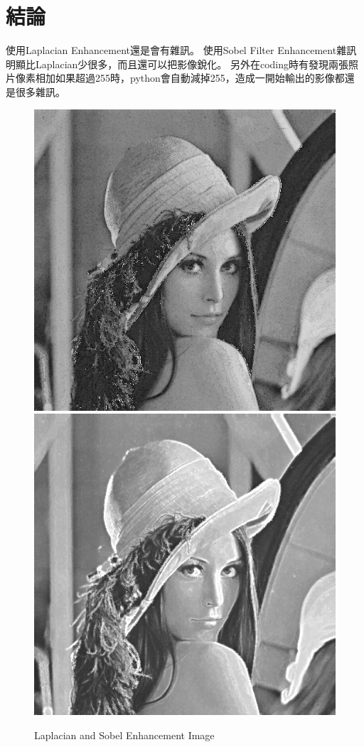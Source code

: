 \documentclass[12pt,a4paper]{article}
\begin{document}
\section{結論}
使用Laplacian Enhancement還是會有雜訊。
\newline
使用Sobel Filter Enhancement雜訊明顯比Laplacian少很多，而且還可以把影像銳化。
\newline
另外在coding時有發現兩張照片像素相加如果超過255時，python會自動減掉255，造成一開始輸出的影像都還是很多雜訊。
\begin{figure}[ht]
\centering
\includegraphics[width=.4\textwidth]{image/lap_enhance_image.png}
\hspace{1cm}
\includegraphics[width=.4\textwidth]{image/FinalEnhancementImage.png}
\caption{Laplacian and Sobel Enhancement Image}%
\label{要合併的兩張圖}%
\end{figure}
\end{document}
